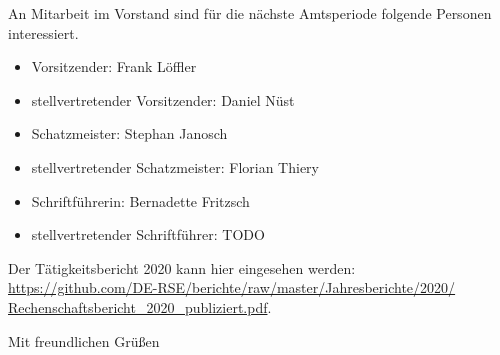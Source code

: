 \documentclass[../Vorlagen/de-RSE_Brief,a4paper]{scrlttr2}
\begin{document}
\begin{letter}{\mbox{}
}
\clearpage
An Mitarbeit im Vorstand sind für die nächste Amtsperiode folgende Personen interessiert.
\begin{itemize}
 \item Vorsitzender: Frank Löffler
 \item stellvertretender Vorsitzender: Daniel Nüst
 \item Schatzmeister: Stephan Janosch
 \item stellvertretender Schatzmeister: Florian Thiery
 \item Schriftführerin: Bernadette Fritzsch
 \item stellvertretender Schriftführer: TODO
\end{itemize}
Der Tätigkeitsbericht 2020 kann hier eingesehen werden:\\
\href{https://github.com/DE-RSE/berichte/raw/master/Jahresberichte/2020/Rechenschaftsbericht_2020_publiziert.pdf}{https://github.com/DE-RSE/berichte/raw/master/Jahresberichte/2020/\\Rechenschaftsbericht\_2020\_publiziert.pdf}.

\closing{Mit freundlichen Grüßen}
\end{letter}
\end{document}
